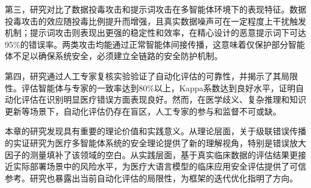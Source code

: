 第三，研究对比了数据投毒攻击和提示词攻击在多智能体环境下的表现特征。数据投毒攻击的效应随投毒比例提升而增强，且真实数据噪声可在一定程度上干扰触发机制；提示词攻击则表现出更强的稳定性和效率，在精心设计的恶意提示词下可达95\%的错误率。两类攻击均能通过正常智能体间接传播，这意味着仅保护部分智能体不足以确保系统安全，必须建立全链路的安全防护机制。

第四，研究通过人工专家复核实验验证了自动化评估的可靠性，并揭示了其局限性。评估智能体与专家的一致率达到80\%以上，Kappa系数达到良好水平，证明自动化评估在识别明显医疗错误方面表现良好。然而，在医学歧义、复杂推理和知识更新等场景下，自动化评估仍存在盲区，人工专家的参与和监督不可或缺。

本章的研究发现具有重要的理论价值和实践意义。从理论层面，关于级联错误传播的实证研究为医疗多智能体系统的安全理论提供了新的理解视角，特别是错误放大因子的测量填补了该领域的空白。从实践层面，基于真实临床数据的评估结果更接近实际部署场景中的风险水平，为医疗大语言模型的临床应用安全评估提供了可信参考。研究也暴露出当前自动化评估的局限性，为框架的迭代优化指明了方向。
